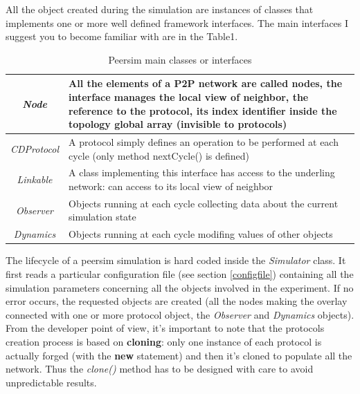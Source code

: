 \documentclass[a4paper,11pt]{article}
\begin{document}
All the object created during the simulation are instances of classes
that implements one or more well defined framework interfaces. The
main interfaces I suggest you to become familiar with are in the Table1. 

\label{table1}%
\begin{table}
\begin{center}\begin{tabular}{|c|p{2.5in}|}
\hline 
\emph{Node}&
All the elements of a P2P network are called nodes, the interface
manages the local view of neighbor, the reference to the protocol,
its index identifier inside the topology global array (invisible to
protocols)\\
\hline 
\emph{CDProtocol}&
A protocol simply defines an operation to be performed at each cycle
(only method nextCycle() is defined)\\
\hline 
\emph{Linkable}&
A class implementing this interface has access to the underling network:
can access to its local view of neighbor\\
\hline 
\emph{Observer}&
Objects running at each cycle collecting data about the current simulation
state\\
\hline 
\emph{Dynamics}&
Objects running at each cycle modifing values of other objects\\
\hline
\end{tabular}\end{center}


\caption{Peersim main classes or interfaces}
\end{table}


The lifecycle of a peersim simulation is hard coded inside the \emph{Simulator}
class. It first reads a particular configuration file (see section 
\ref{configfile}) containing all the simulation parameters 
concerning all the
objects involved in the experiment. If no error occurs, the requested
objects are created (all the nodes making the overlay connected with
one or more protocol object, the \emph{Observer} and
\emph{Dynamics} objects).
From the developer point of view, it's important to note that the
protocols creation process is based on \textbf{cloning}: only one instance
of each protocol is actually forged (with the \textbf{new} statement)
and then it's cloned to populate all the network. Thus the 
\emph{clone()} method has to be designed with care to avoid 
unpredictable results.
\end{document}
